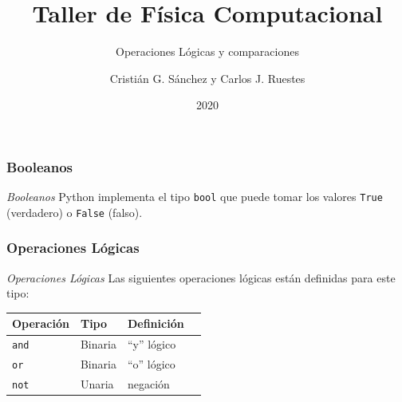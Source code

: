 \documentclass{beamer}
\title{Taller de Física Computacional}
\subtitle{Operaciones Lógicas y comparaciones}
\author{Cristián G. Sánchez y Carlos J. Ruestes}
\date{2020}
\begin{document}
\frame{\titlepage}

\begin{frame}[fragile]
    \frametitle{Booleanos}
    \begin{block}{{\em Booleanos}}
    Python implementa el tipo \texttt{bool} que puede tomar los valores \texttt{True} (verdadero)
    o \texttt{False} (falso). 
    \end{block}

    \end{frame}

\begin{frame}[fragile]
    \frametitle{Operaciones Lógicas}
    \begin{block}{{\em Operaciones Lógicas}}
     Las siguientes operaciones lógicas están definidas para este tipo:
        \begin{center}
            \begin{table}[]
                \begin{tabular}{@{}llll@{}}
                \toprule
                 Operación & Tipo & Definición  \\ \midrule
                 \texttt{and} & Binaria & ``y'' lógico   \\
                 \texttt{or}  & Binaria & ``o'' lógico  \\ 
                 \texttt{not} & Unaria  & negación  \\ \bottomrule
                \end{tabular}
            \end{table}
        \end{center}
    \end{block}
    \end{frame}
\end{document}
